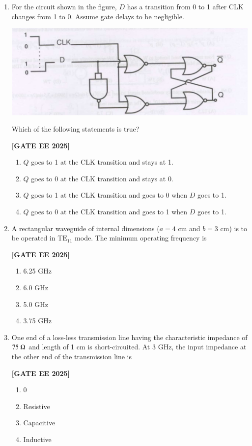 \documentclass[12pt]{article}
\begin{document}
\begin{enumerate}[leftmargin=*, label=\textbf{Q.\arabic*:}]
\item For the circuit shown in the figure, $D$ has a transition from 0 to 1 after CLK changes from 1 to 0. Assume gate delays to be negligible.

\begin{center}
\includegraphics[width=0.6\columnwidth]{figs/q60.png}
\end{center}

Which of the following statements is true?
 
\noindent \textbf{[GATE EE 2025]}
\begin{enumerate}
  \item $Q$ goes to 1 at the CLK transition and stays at 1.
  \item $Q$ goes to 0 at the CLK transition and stays at 0.
  \item $Q$ goes to 1 at the CLK transition and goes to 0 when $D$ goes to 1.
  \item $Q$ goes to 0 at the CLK transition and goes to 1 when $D$ goes to 1.
\end{enumerate}

\item A rectangular waveguide of internal dimensions ($a=4$ cm and $b=3$ cm) is to be operated in $\mathrm{TE}_{11}$ mode. The minimum operating frequency is
 
\noindent \textbf{[GATE EE 2025]}
\begin{enumerate}
  \item 6.25 GHz
  \item 6.0 GHz
  \item 5.0 GHz
  \item 3.75 GHz
\end{enumerate}

\item One end of a loss-less transmission line having the characteristic impedance of $75\;\ohm$ and length of 1 cm is short-circuited. At 3 GHz, the input impedance at the other end of the transmission line is
 
\noindent \textbf{[GATE EE 2025]}
\begin{enumerate}
  \item 0
  \item Resistive
  \item Capacitive
  \item Inductive
\end{enumerate}


\end{enumerate}
\end{document}
